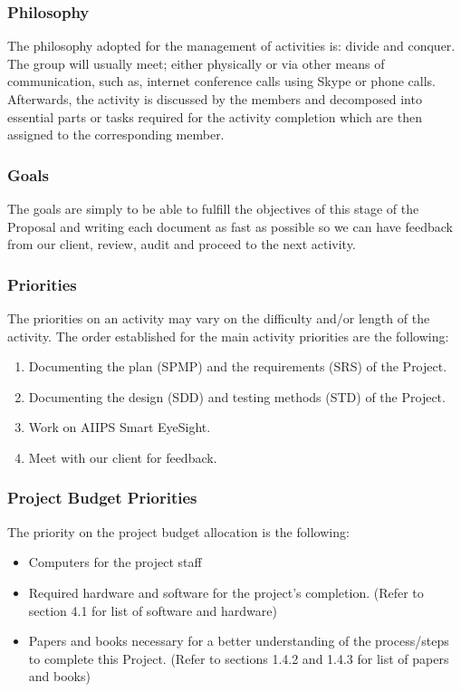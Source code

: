 \documentclass[12pt]{article}
\begin{document}
\subsubsection{Philosophy}
The philosophy adopted for the management of activities is: divide and conquer. The group will usually meet; either physically or via other means of communication, such as, internet conference calls using Skype or phone calls. Afterwards, the activity is discussed by the members and decomposed into essential parts or tasks required for the activity completion which are then assigned to the corresponding member.

\subsubsection{Goals}
The goals are simply to be able to fulfill the objectives of this stage of the Proposal and writing each document as fast as possible so we can have feedback from our client, review, audit and proceed to the next activity.

\subsubsection{Priorities}
The priorities on an activity may vary on the difficulty and/or length of the activity. The order established for the main activity priorities are the following:

\begin{enumerate}
  \item Documenting the plan (SPMP) and the requirements (SRS) of the Project.
  \item Documenting the design (SDD) and testing methods (STD) of the Project.
  \item Work on AIIPS Smart EyeSight. 
  \item Meet with our client for feedback.
\end{enumerate}

\subsubsection{Project Budget Priorities}
The priority on the project budget allocation is the following:
\begin{itemize}
  \item Computers for the project staff
  \item Required hardware and software for the project’s completion. (Refer to section 4.1 for list of software and hardware)
  \item Papers and books necessary for a better understanding of the process/steps to complete this Project. (Refer to sections 1.4.2 and 1.4.3 for list of papers and books)
\end{itemize}
\end{document}
